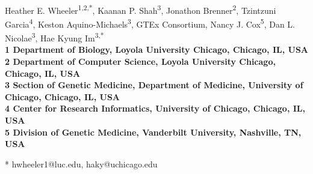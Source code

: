 \documentclass[10pt,letterpaper]{article}
\date{}
\begin{document}
\vspace*{0.35in}

\begin{flushleft}
{\Large
\textbf{}
}
\newline
\\
Heather E. Wheeler\textsuperscript{1,2,*},
Kaanan P. Shah\textsuperscript{3},
Jonathon Brenner\textsuperscript{2},
Tzintzuni Garcia\textsuperscript{4},
Keston Aquino-Michaels\textsuperscript{3},
GTEx Consortium,
Nancy J. Cox\textsuperscript{5}, Dan L.
Nicolae\textsuperscript{3}, Hae Kyung Im\textsuperscript{3,*}
\\
\bigskip
\bf{1} Department of Biology, Loyola University Chicago, Chicago, IL, USA
\\
\bf{2} Department of Computer Science, Loyola University Chicago, Chicago, IL, USA
\\
\bf{3} Section of Genetic Medicine, Department of Medicine, University of Chicago, Chicago, IL, USA
\\
\bf{4} Center for Research Informatics, University of Chicago, Chicago, IL, USA
\\
\bf{5} Division of Genetic Medicine, Vanderbilt University, Nashville, TN, USA
\bigskip

% 
%





* hwheeler1@luc.edu, haky@uchicago.edu

\end{flushleft}
\end{document}
